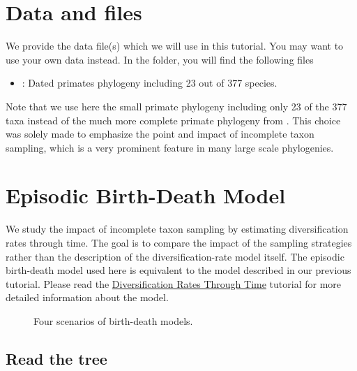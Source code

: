 \section{Data and files}

We provide the data file(s) which we will use in this tutorial.
You may want to use your own data instead.
In the  folder, you will find the following files
\begin{itemize}
\item {}: Dated primates phylogeny including 23 out of 377 species.
\end{itemize}
Note that we use here the small primate phylogeny including only 23 of the 377 taxa instead of the much more complete primate phylogeny from \cite{Springer2012}.
This choice was solely made to emphasize the point and impact of incomplete taxon sampling, which is a very prominent feature in many large scale phylogenies.



\bigskip
\section{Episodic Birth-Death Model}

We study the impact of incomplete taxon sampling by estimating diversification rates through time.
The goal is to compare the impact of the sampling strategies rather than the description of the diversification-rate model itself.
The episodic birth-death model used here is equivalent to the model described in our previous tutorial.
Please read the \href{https://github.com/revbayes/revbayes_tutorial/raw/master/tutorial_TeX/RB_DiversificationRate_Episodic_Tutorial/RB_DiversificationRate_Episodic_Tutorial.pdf}{Diversification Rates Through Time} tutorial for more detailed information about the model.

\begin{figure}[h!]
\centering
{}
\caption{\small Four scenarios of birth-death models.}
\label{fig:EBD}
\end{figure}



\subsection{Read the tree}

